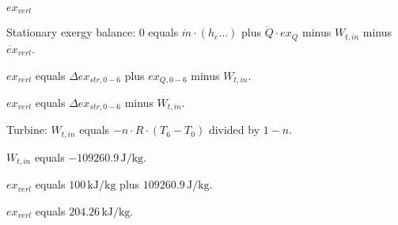 \( ex_{verl} \)  

Stationary exergy balance:  
0 equals \( \dot{m} \cdot (h_e \ldots) \) plus \( \dot{Q} \cdot ex_{Q} \) minus \( W_{t,in} \) minus \( \dot{ex}_{verl} \).  

\( ex_{verl} \) equals \( \Delta ex_{str,0-6} \) plus \( ex_{Q,0-6} \) minus \( W_{t,in} \).  

\( ex_{verl} \) equals \( \Delta ex_{str,0-6} \) minus \( W_{t,in} \).  

Turbine:  
\( W_{t,in} \) equals \( -n \cdot R \cdot (T_6 - T_0) \) divided by \( 1 - n \).  

\( W_{t,in} \) equals \( -109260.9 \, \text{J/kg} \).  

\( ex_{verl} \) equals \( 100 \, \text{kJ/kg} \) plus \( 109260.9 \, \text{J/kg} \).  

\( ex_{verl} \) equals \( 204.26 \, \text{kJ/kg} \).